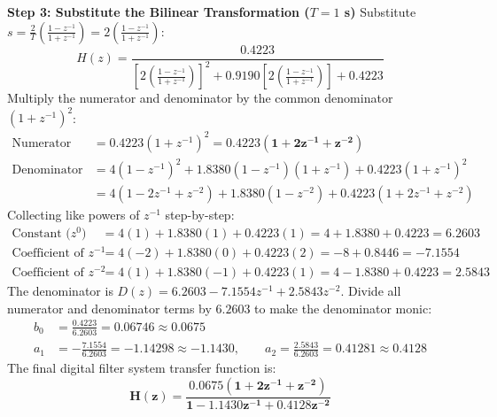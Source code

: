 \documentclass[11pt,a4paper]{article}
\begin{document}
\noindent\textbf{Step 3: Substitute the Bilinear Transformation ($T = 1$ s)}
Substitute $s = \frac{2}{T}\left(\frac{1 - z^{-1}}{1 + z^{-1}}\right) = 2\left(\frac{1 - z^{-1}}{1 + z^{-1}}\right)$:
\begin{equation}
H(z) = \frac{0.4223}{\left[2\left(\frac{1 - z^{-1}}{1 + z^{-1}}\right)\right]^2 + 0.9190\left[2\left(\frac{1 - z^{-1}}{1 + z^{-1}}\right)\right] + 0.4223}
\end{equation}
Multiply the numerator and denominator by the common denominator $(1 + z^{-1})^2$:
\begin{align}
\text{Numerator} &= 0.4223 (1 + z^{-1})^2 = \mathbf{0.4223 (1 + 2z^{-1} + z^{-2})} \nonumber \\
\text{Denominator} &= 4(1 - z^{-1})^2 + 1.8380(1 - z^{-1})(1 + z^{-1}) + 0.4223(1 + z^{-1})^2 \nonumber \\
&= 4(1 - 2z^{-1} + z^{-2}) + 1.8380(1 - z^{-2}) + 0.4223(1 + 2z^{-1} + z^{-2})
\end{align}
Collecting like powers of $z^{-1}$ step-by-step:
\begin{align}
\text{Constant ($z^0$)} &= 4(1) + 1.8380(1) + 0.4223(1) = 4 + 1.8380 + 0.4223 = \mathbf{6.2603} \nonumber \\
\text{Coefficient of $z^{-1}$} &= 4(-2) + 1.8380(0) + 0.4223(2) = -8 + 0.8446 = \mathbf{-7.1554} \nonumber \\
\text{Coefficient of $z^{-2}$} &= 4(1) + 1.8380(-1) + 0.4223(1) = 4 - 1.8380 + 0.4223 = \mathbf{2.5843}
\end{align}
The denominator is $D(z) = 6.2603 - 7.1554 z^{-1} + 2.5843 z^{-2}$. Divide all numerator and denominator terms by $6.2603$ to make the denominator monic:
\begin{align}
b_0 &= \frac{0.4223}{6.2603} = \mathbf{0.06746 \approx 0.0675} \nonumber \\
a_1 &= -\frac{7.1554}{6.2603} = \mathbf{-1.14298 \approx -1.1430}, \qquad a_2 = \frac{2.5843}{6.2603} = \mathbf{0.41281 \approx 0.4128}
\end{align}
The final digital filter system transfer function is:
\begin{equation}
\mathbf{H(z) = \frac{0.0675 (1 + 2z^{-1} + z^{-2})}{1 - 1.1430 z^{-1} + 0.4128 z^{-2}}}
\end{equation}
\end{document}
